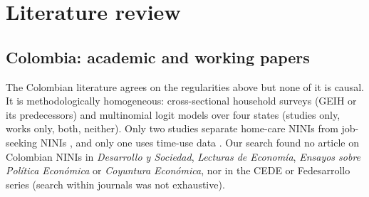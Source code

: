 \documentclass[11pt]{article}
\begin{document}
\section{Literature review}\label{sec:lit}

\subsection{Colombia: academic and working papers}

The Colombian literature agrees on the regularities above but none of it is causal. It is methodologically homogeneous: cross-sectional household surveys (GEIH or its predecessors) and multinomial logit models over four states (studies only, works only, both, neither). Only two studies separate home-care NINIs from job-seeking NINIs \citep{hernandez2016,lenis2021}, and only one uses time-use data \citep{ochoa2015}. Our search found no article on Colombian NINIs in \textit{Desarrollo y Sociedad}, \textit{Lecturas de Econom\'ia}, \textit{Ensayos sobre Pol\'itica Econ\'omica} or \textit{Coyuntura Econ\'omica}, nor in the CEDE or Fedesarrollo series (search within journals was not exhaustive).
\end{document}
